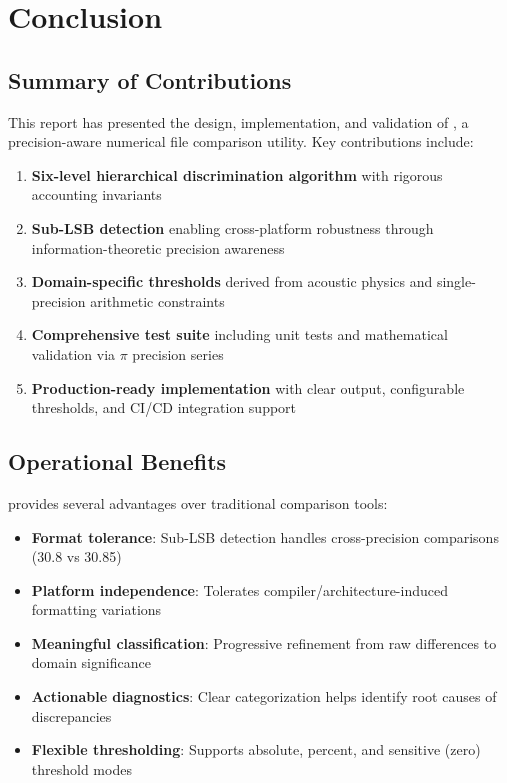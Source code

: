 \section{Conclusion}
\label{sec:conclusion}

\subsection{Summary of Contributions}

This report has presented the design, implementation, and validation of \ubdiff{}, a precision-aware numerical file comparison utility. Key contributions include:

\begin{enumerate}
    \item \textbf{Six-level hierarchical discrimination algorithm} with rigorous accounting invariants

    \item \textbf{Sub-LSB detection} enabling cross-platform robustness through information-theoretic precision awareness

    \item \textbf{Domain-specific thresholds} derived from acoustic physics and single-precision arithmetic constraints

    \item \textbf{Comprehensive test suite} including unit tests and mathematical validation via $\pi$ precision series

    \item \textbf{Production-ready implementation} with clear output, configurable thresholds, and CI/CD integration support
\end{enumerate}

\subsection{Operational Benefits}

\ubdiff{} provides several advantages over traditional comparison tools:

\begin{itemize}
    \item \textbf{Format tolerance}: Sub-LSB detection handles cross-precision comparisons (30.8 vs 30.85)

    \item \textbf{Platform independence}: Tolerates compiler/architecture-induced formatting variations

    \item \textbf{Meaningful classification}: Progressive refinement from raw differences to domain significance

    \item \textbf{Actionable diagnostics}: Clear categorization helps identify root causes of discrepancies

    \item \textbf{Flexible thresholding}: Supports absolute, percent, and sensitive (zero) threshold modes
\end{itemize}


